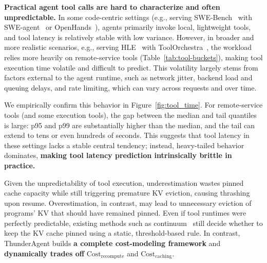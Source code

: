 \noindent\textbf{Practical agent tool calls are hard to characterize and often unpredictable.} In some code-centric settings (e.g., serving SWE-Bench~\citep{jimenez2024swebenchlanguagemodelsresolve} with SWE-agent~\citep{yang2024sweagentagentcomputerinterfacesenable} or OpenHands~\citep{wang2025openhandsopenplatformai}), agents primarily invoke local, lightweight tools, and tool latency is relatively stable with low variance. However, in broader and more realistic scenarios, e.g., serving HLE~\citep{phan2025humanitysexam} with ToolOrchestra~\citep{su2025toolorchestraelevatingintelligenceefficient}, the workload relies more heavily on remote-service tools (Table~\ref{tab:tool-buckets}), making tool execution time volatile and difficult to predict. This volatility largely stems from factors external to the agent runtime, such as network jitter, backend load and queuing delays, and rate limiting, which can vary across requests and over time.

We empirically confirm this behavior in Figure~\ref{fig:tool_time}. For remote-service tools (and some execution tools), the gap between the median and tail quantiles is large: p95 and p99 are substantially higher than the median, and the tail can extend to tens or even hundreds of seconds. This suggests that tool latency in these settings lacks a stable central tendency; instead, heavy-tailed behavior dominates, \textbf{making tool latency prediction intrinsically brittle in practice.}

Given the unpredictability of tool execution, underestimation wastes pinned cache capacity while still triggering premature KV eviction, causing thrashing upon resume. Overestimation, in contrast, may lead to unnecessary eviction of programs' KV that should have remained pinned. Even if tool runtimes were perfectly predictable, existing methods such as continuum~\cite{li2025continuumefficientrobustmultiturn} still decide whether to keep the KV cache pinned using a static, threshold-based rule. In contrast, ThunderAgent builds \textbf{a complete cost-modeling framework} and \textbf{dynamically trades off} $\text{Cost}_{\text{recompute}}$ and $\text{Cost}_{\text{caching}}$.








